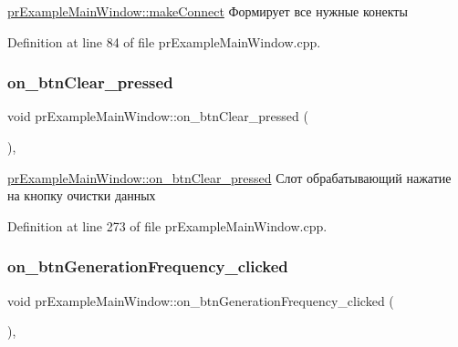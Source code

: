 \hyperlink{classpr_example_main_window_a05eb7e290281288b56ac087490bcd191}{pr\+Example\+Main\+Window\+::make\+Connect} Формирует все нужные конекты 



Definition at line 84 of file pr\+Example\+Main\+Window.\+cpp.

\mbox{\label{classpr_example_main_window_a233e9d66312214a27a782870e2fd403e}} 
\subsubsection{\texorpdfstring{on\+\_\+btn\+Clear\+\_\+pressed}{on\_btnClear\_pressed}}
{\footnotesize\ttfamily void pr\+Example\+Main\+Window\+::on\+\_\+btn\+Clear\+\_\+pressed (\begin{DoxyParamCaption}{ }\end{DoxyParamCaption})\hspace{0.3cm}{\ttfamily [private]}, {\ttfamily [slot]}}



\hyperlink{classpr_example_main_window_a233e9d66312214a27a782870e2fd403e}{pr\+Example\+Main\+Window\+::on\+\_\+btn\+Clear\+\_\+pressed} Слот обрабатывающий нажатие на кнопку очистки данных 



Definition at line 273 of file pr\+Example\+Main\+Window.\+cpp.

\mbox{\label{classpr_example_main_window_ae70fafa427f7bf3c30683ad3e3760d12}} 
\subsubsection{\texorpdfstring{on\+\_\+btn\+Generation\+Frequency\+\_\+clicked}{on\_btnGenerationFrequency\_clicked}}
{\footnotesize\ttfamily void pr\+Example\+Main\+Window\+::on\+\_\+btn\+Generation\+Frequency\+\_\+clicked (\begin{DoxyParamCaption}{ }\end{DoxyParamCaption})\hspace{0.3cm}{\ttfamily [private]}, {\ttfamily [slot]}}



